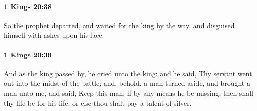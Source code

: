 		\paragraph{1 Kings 20:38} %
			\label{1KINGS-20-38}

			So the prophet departed, and waited for the king by the way, and disguised himself with ashes upon his face.


		\paragraph{1 Kings 20:39} %
			\label{1KINGS-20-39}

			And as the king passed by, he cried unto the king: and he said, Thy servant went out into the midst of the battle; and, behold, a man turned aside, and brought a man unto me, and said, Keep this man: if by any means he be missing, then shall thy life be for his life, or else thou shalt pay a talent of silver.

